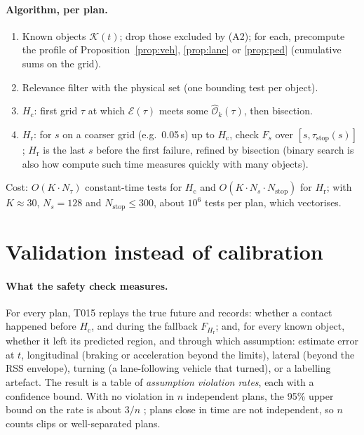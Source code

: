 \documentclass[11pt]{article}
\theoremstyle{definition}
\theoremstyle{remark}
\newcommand{\Ohat}{\widehat{\mathcal{O}}}
\newcommand{\Ego}{\mathcal{E}}
\newcommand{\Hc}{H_{\mathrm{c}}}
\newcommand{\Hr}{H_{\mathrm{r}}}
\begin{document}
\paragraph{Algorithm, per plan.}
\begin{enumerate}[leftmargin=*]
  \item Known objects $\mathcal K(t)$; drop those excluded by (A2); for each, precompute the profile of
    Proposition~\ref{prop:veh}, \ref{prop:lane} or \ref{prop:ped} (cumulative sums on the grid).
  \item Relevance filter with the physical set (one bounding test per object).
  \item $\Hc$: first grid $\tau$ at which $\Ego(\tau)$ meets some $\Ohat_k(\tau)$, then bisection.
  \item $\Hr$: for $s$ on a coarser grid (e.g.\ 0.05\,s) up to $\Hc$, check $F_s$ over
    $[s,\tau_{\mathrm{stop}}(s)]$; $\Hr$ is the last $s$ before the first failure, refined by bisection
    (binary search is also how \cite{tamke2011} compute such time measures quickly with many objects).
\end{enumerate}
Cost: $O(K\cdot N_\tau)$ constant-time tests for $\Hc$ and $O(K\cdot N_s\cdot N_{\mathrm{stop}})$ for $\Hr$;
with $K\approx30$, $N_s=128$ and $N_{\mathrm{stop}}\le300$, about $10^6$ tests per plan, which vectorises.

\section{Validation instead of calibration}\label{sec:validation}

\paragraph{What the safety check measures.} For every plan, T015 replays the true future and records:
whether a contact happened before $\Hc$, and during the fallback $F_{\Hr}$; and, for every known object,
whether it left its predicted region, and through which assumption: estimate error at $t$, longitudinal
(braking or acceleration beyond the limits), lateral (beyond the RSS envelope), turning (a lane-following
vehicle that turned), or a labelling artefact. The result is a table of \emph{assumption violation rates},
each with a confidence bound. With no violation in $n$ independent plans, the 95\% upper bound on the rate
is about $3/n$ \cite{hanley1983}; plans close in time are not independent, so $n$ counts clips or
well-separated plans.
\end{document}
